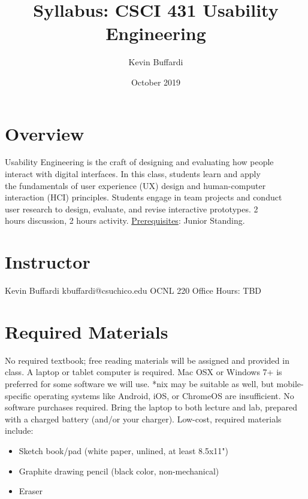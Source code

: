 \documentclass[12pt]{article}
\title{Syllabus: CSCI 431 Usability Engineering}
\author{Kevin Buffardi}
\date{October 2019}
\begin{document}
  \maketitle
  \section*{Overview}	 
  \noindent
  Usability Engineering is the craft of designing and evaluating how people\\
  interact with digital interfaces. In this class, students learn and apply\\
  the fundamentals of user experience (UX) design and human-computer\\
  interaction (HCI) principles. Students engage in team projects and conduct\\
  user research to design, evaluate, and revise interactive prototypes. 2\\
  hours discussion, 2 hours activity.
  \newline
  \underline{Prerequisites}: Junior Standing.
  
  \section*{Instructor}
  \noindent
  Kevin Buffardi
  \newline
  kbuffardi@csuchico.edu
  \newline
  OCNL 220
  \newline
  Office Hours: TBD

  \section*{Required Materials}
  \noindent
  No required textbook; free reading materials will be assigned and provided in class.
  \newline
  A laptop or tablet computer is required. Mac OSX or Windows 7+ is preferred for some software we will use. *nix may be suitable as well, but mobile-specific operating systems like Android, iOS, or ChromeOS are insufficient. No software purchases required. Bring the laptop to both lecture and lab, prepared with a charged battery (and/or your charger).
  \newline
  Low-cost, required materials include:
  \begin{itemize}
    \item Sketch book/pad (white paper, unlined, at least 8.5x11")
    \item Graphite drawing pencil (black color, non-mechanical)
    \item Eraser
  \end{itemize}
\end{document}
